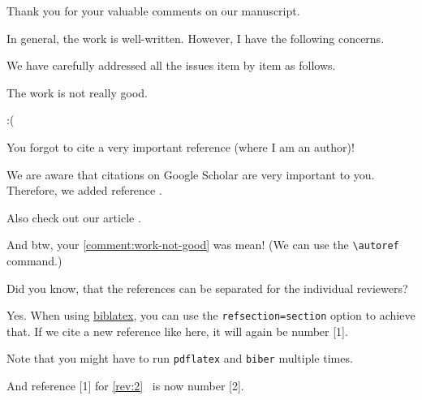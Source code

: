 \documentclass[12pt,english]{reviewresponse}
\begin{document}
\begin{concludingresponse}[]
  Thank you for your valuable comments on our manuscript.
\end{concludingresponse}

\reviewer
\label{rev:2}
\begin{generalcomment}
  In general, the work is well-written. However, I have the following concerns.
\end{generalcomment}
\begin{revresponse}
  We have carefully addressed all the issues item by item as follows.
\end{revresponse}

\begin{revcomment}\label{comment:work-not-good}
  The work is not really good.
\end{revcomment}
\begin{revresponse}
  :(
  \end{revresponse}

  \begin{revcomment}
    You forgot to cite a very important reference (where I am an author)!
  \end{revcomment}
  \begin{revresponse}
    We are aware that citations on Google Scholar are very important to you.
    Therefore, we added reference \cite{ReviewerReference}.

    Also check out our article \cite{Besser2020}.


    And btw, your \autoref{comment:work-not-good} was mean! (We can use the \verb|\autoref| command.)
  \end{revresponse}

  \reviewer
  \begin{revcomment}
    Did you know, that the references can be separated for the individual reviewers?
  \end{revcomment}
  \begin{revresponse}
    Yes. When using \href{https://www.ctan.org/pkg/biblatex}{biblatex}, you can use the \texttt{refsection=section} option to achieve that.
    If we cite a new reference like \cite{Besser2021} here, it will again be number [1].

    Note that you might have to run \texttt{pdflatex} and \texttt{biber} multiple times.

    And reference [1] for \autoref{rev:2}~\cite{ReviewerReference} is now number [2].

  \end{revresponse}
  
\end{document}

